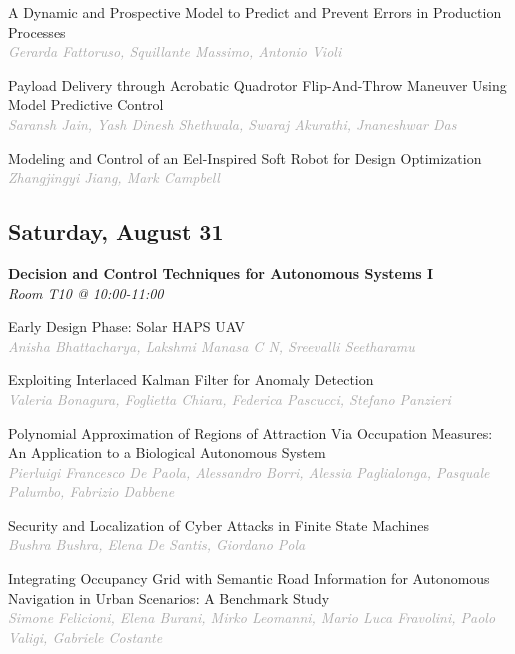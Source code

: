 \begin{multicols*}{2}
\small A Dynamic and Prospective Model to Predict and Prevent Errors in Production Processes\\ 
\footnotesize \textcolor{darkgray}{\textit{Gerarda Fattoruso, Squillante  Massimo, Antonio  Violi}}

\small Payload Delivery through Acrobatic Quadrotor Flip-And-Throw Maneuver Using Model Predictive Control\\ 
\footnotesize \textcolor{darkgray}{\textit{Saransh Jain, Yash Dinesh  Shethwala, Swaraj  Akurathi, Jnaneshwar  Das}}

\small Modeling and Control of an Eel-Inspired Soft Robot for Design Optimization\\ 
\footnotesize \textcolor{darkgray}{\textit{Zhangjingyi Jiang, Mark  Campbell}}

\subsection*{Saturday, August 31}

\normalsize \textbf{Decision and Control Techniques for Autonomous Systems I}\\
\small \textit{Room T10 @ 10:00-11:00}

\small Early Design Phase: Solar HAPS UAV\\ 
\footnotesize \textcolor{darkgray}{\textit{Anisha Bhattacharya, Lakshmi Manasa  C N, Sreevalli  Seetharamu}}

\small Exploiting Interlaced Kalman Filter for Anomaly Detection\\ 
\footnotesize \textcolor{darkgray}{\textit{Valeria Bonagura, Foglietta  Chiara, Federica  Pascucci, Stefano  Panzieri}}

\small Polynomial Approximation of Regions of Attraction Via Occupation Measures: An Application to a Biological Autonomous System\\ 
\footnotesize \textcolor{darkgray}{\textit{Pierluigi Francesco De Paola, Alessandro  Borri, Alessia  Paglialonga, Pasquale  Palumbo, Fabrizio  Dabbene}}

\small Security and Localization of Cyber Attacks in Finite State Machines\\ 
\footnotesize \textcolor{darkgray}{\textit{Bushra Bushra, Elena  De Santis, Giordano  Pola}}

\small Integrating Occupancy Grid with Semantic Road Information for Autonomous Navigation in Urban Scenarios: A Benchmark Study\\ 
\footnotesize \textcolor{darkgray}{\textit{Simone Felicioni, Elena  Burani, Mirko  Leomanni, Mario Luca  Fravolini, Paolo  Valigi, Gabriele  Costante}}


\end{multicols*}
